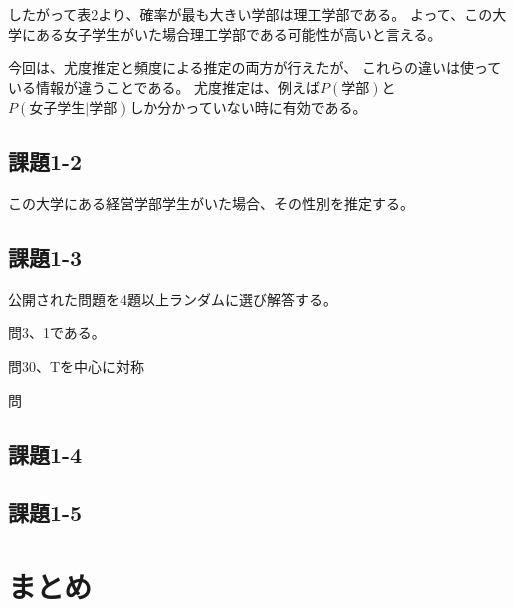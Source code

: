 \documentclass[12pt]{jarticle}
\begin{document}
したがって表2より、確率が最も大きい学部は理工学部である。
よって、この大学にある女子学生がいた場合理工学部である可能性が高いと言える。

今回は、尤度推定と頻度による推定の両方が行えたが、
これらの違いは使っている情報が違うことである。
尤度推定は、例えば$P(学部)$と$P(女子学生|学部)$しか分かっていない時に有効である。

\subsection{課題1-2}
\begin{shadebox}
    この大学にある経営学部学生がいた場合、その性別を推定する。
\end{shadebox}

\subsection{課題1-3}
\begin{shadebox}
    公開された問題を4題以上ランダムに選び解答する。
\end{shadebox}
問3、1である。


問30、Tを中心に対称

問


\subsection{課題1-4}
\begin{shadebox}
\end{shadebox}

\subsection{課題1-5}
\begin{shadebox}
\end{shadebox}

\section{まとめ}


\clearpage

\begin{thebibliography}{99}
    \label{sannkoubunnkenn_chapter}

\end{thebibliography}


\clearpage

\appendix

\end{document}

